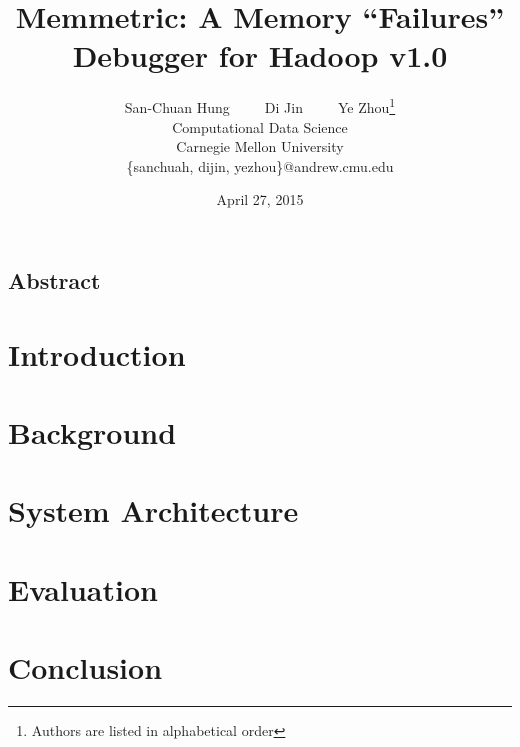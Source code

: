\documentclass[letterpaper,twocolumn,10pt]{article}
\begin{document}
\date{April 27, 2015}

\title{\Large \bf Memmetric: A Memory “Failures” Debugger for Hadoop v1.0}

\author{
{\rm San-Chuan Hung}~~~~~{\rm Di Jin}~~~~~{\rm Ye Zhou}\thanks{Authors are listed in alphabetical order}\\
Computational Data Science\\
Carnegie Mellon University\\
\{sanchuah, dijin, yezhou\}@andrew.cmu.edu\\
} %

\maketitle

\thispagestyle{empty}


\subsection*{Abstract}
\label{sec:dl}


\section{Introduction}


\section{Background}


\section{System Architecture}


\section{Evaluation}


\section{Conclusion}




\end{document}
